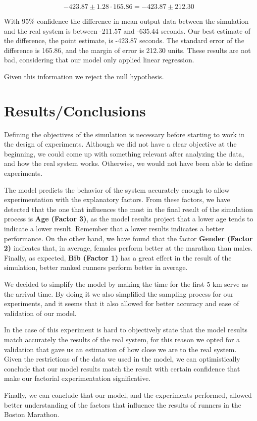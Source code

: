 \documentclass[11pt, oneside]{article}   	%
\begin{document}
$$-423.87 \pm 1.28 \cdot 165.86 = -423.87 \pm 212.30$$

With 95\% confidence the difference in mean output data between the simulation and the real system is between -211.57 and -635.44 seconds. Our best estimate of the difference, the point estimate, is -423.87 seconds. The standard error of the difference is 165.86, and the margin of error is 212.30 units. These results are not bad, considering that our model only applied linear regression. 

Given this information we reject the null hypothesis.

\section{Results/Conclusions}

Defining the objectives of the simulation is necessary before starting to work in the design of experiments. Although we did not have a clear objective at the beginning, we could come up with something relevant after analyzing the data, and how the real system works. Otherwise, we would not have been able to define experiments.

The model predicts the behavior of the system accurately enough to allow experimentation with the explanatory factors. From these factors, we have detected that the one that influences the most in the final result of the simulation process is \textbf{Age (Factor 3)}, as the model results project that a lower age tends to indicate a lower result. Remember that a lower results indicates a better performance. On the other hand, we have found that the factor \textbf{Gender (Factor 2)} indicates that, in average, females perform better at the marathon than males. Finally, as expected, \textbf{Bib (Factor 1)} has a great effect in the result of the simulation, better ranked runners perform better in average.

We decided to simplify the model by making the time for the first 5 km serve as the arrival time. By doing it we also simplified the sampling process for our experiments, and it seems that it also allowed for better accuracy and ease of validation of our model.

In the case of this experiment is hard to objectively state that the model results match accurately the results of the real system, for this reason we opted for a validation that gave us an estimation of how close we are to the real system. Given the restrictions of the data we used in the model, we can optimistically conclude that our model results match the result with certain confidence that make our factorial experimentation significative.

Finally, we can conclude that our model, and the experiments performed, allowed better understanding of the factors that influence the results of runners in the Boston Marathon. 
\end{document}
